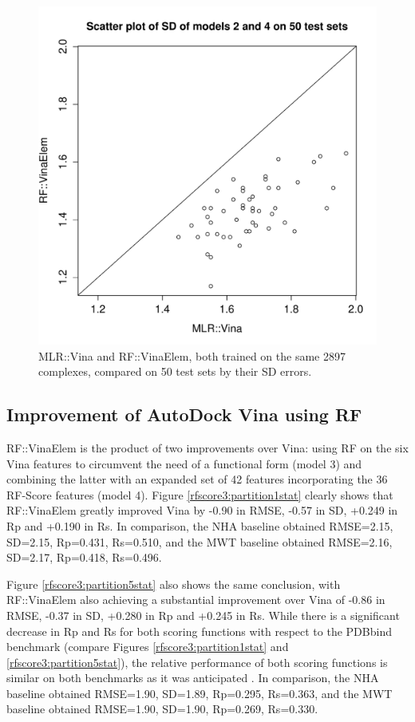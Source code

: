 \begin{figure}
\centering
\includegraphics[width=\linewidth]{../rfscore3/Models24SD.pdf}
\caption{MLR::Vina and RF::VinaElem, both trained on the same 2897 complexes, compared on 50 test sets by their SD errors.}
\label{rfscore3:Models24SD}
\end{figure}

\subsection{Improvement of AutoDock Vina using RF}

RF::VinaElem is the product of two improvements over Vina: using RF on the six Vina features to circumvent the need of a functional form (model 3) and combining the latter with an expanded set of 42 features incorporating the 36 RF-Score features (model 4). Figure \ref{rfscore3:partition1stat} clearly shows that RF::VinaElem greatly improved Vina by -0.90 in RMSE, -0.57 in SD, +0.249 in Rp and +0.190 in Rs. In comparison, the NHA baseline obtained RMSE=2.15, SD=2.15, Rp=0.431, Rs=0.510, and the MWT baseline obtained RMSE=2.16, SD=2.17, Rp=0.418, Rs=0.496.

Figure \ref{rfscore3:partition5stat} also shows the same conclusion, with RF::VinaElem also achieving a substantial improvement over Vina of -0.86 in RMSE, -0.37 in SD, +0.280 in Rp and +0.245 in Rs. While there is a significant decrease in Rp and Rs for both scoring functions with respect to the PDBbind benchmark (compare Figures \ref{rfscore3:partition1stat} and \ref{rfscore3:partition5stat}), the relative performance of both scoring functions is similar on both benchmarks as it was anticipated \citep{908}. In comparison, the NHA baseline obtained RMSE=1.90, SD=1.89, Rp=0.295, Rs=0.363, and the MWT baseline obtained RMSE=1.90, SD=1.90, Rp=0.269, Rs=0.330.

